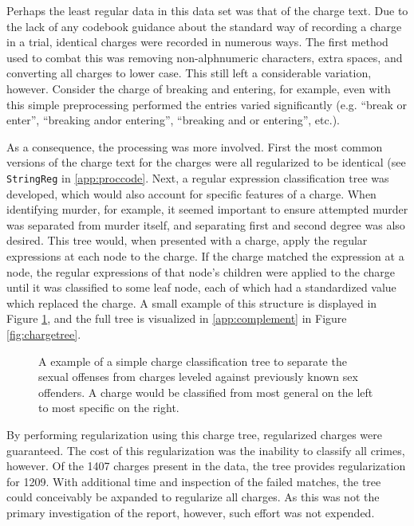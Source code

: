 Perhaps the least regular data in this data set was that of the charge text. Due to the lack of any codebook guidance about the
standard way of recording a charge in a trial, identical charges were recorded in numerous ways. The first method used to combat
this was removing non-alphnumeric characters, extra spaces, and converting all charges to lower case. This still left a
considerable variation, however. Consider the charge of breaking and entering, for example, even with this simple preprocessing
performed the entries varied significantly (e.g. ``break or enter'', ``breaking andor entering'', ``breaking and or entering'',
etc.).

As a consequence, the processing was more involved. First the most common versions of the charge text for the charges were all
regularized to be identical (see \texttt{StringReg} in \ref{app:proccode}. Next, a regular expression classification tree was
developed, which would also account for specific features of a charge. When identifying murder, for example, it seemed important
to ensure attempted murder was separated from murder itself, and separating first and second degree was also desired. This tree
would, when presented with a charge, apply the regular expressions at each node to the charge. If the charge matched the
expression at a node, the regular expressions of that node's children were applied to the charge until it was classified to some
leaf node, each of which had a standardized value which replaced the charge. A small example of this structure is displayed in
Figure \ref{fig:exampletree}, and the full tree is visualized in \ref{app:complement} in Figure \ref{fig:chargetree}.

\begin{figure}[!h]
  \centering
  \caption[Simple Charge Tree Example]{A example of a simple charge classification tree to separate the sexual offenses from
    charges leveled against previously known sex offenders. A charge would be classified from most general on the left to most
    specific on the right.}
  \label{fig:exampletree}
\end{figure}

By performing regularization using this charge tree, regularized charges were guaranteed. The cost of this regularization was the
inability to classify all crimes, however. Of the 1407 charges present in the data, the tree provides regularization for
1209. With additional time and inspection of the failed matches, the tree could conceivably be axpanded to regularize all
charges. As this was not the primary investigation of the report, however, such effort was not expended.

